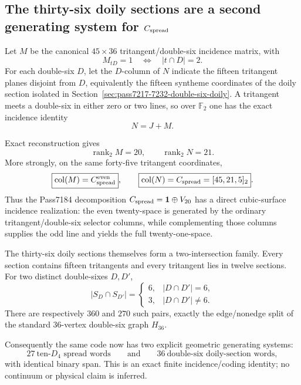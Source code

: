 \subsection{The thirty-six doily sections are a second generating system for $C_{\rm spread}$}
\label{sec:pass7241-7248-double-six-slice-generator}

Let $M$ be the canonical $45\times36$ tritangent/double-six incidence matrix, with
\[
 M_{tD}=1
 \quad\Longleftrightarrow\quad
 |t\cap D|=2.
\]
For each double-six $D$, let the $D$-column of $N$ indicate the fifteen tritangent planes disjoint from $D$, equivalently the fifteen syntheme coordinates of the doily section isolated in Section~\ref{sec:pass7217-7232-double-six-doily}.  A tritangent meets a double-six in either zero or two lines, so over $\mathbb F_2$ one has the exact incidence identity
\[
 \boxed{N=J+M}.
\]

Exact reconstruction gives
\[
 \operatorname{rank}_{2}M=20,
 \qquad
 \operatorname{rank}_{2}N=21.
\]
More strongly, on the same forty-five tritangent coordinates,
\[
 \boxed{\operatorname{col}(M)=C_{\rm spread}^{\rm even}},
 \qquad
 \boxed{\operatorname{col}(N)=C_{\rm spread}=[45,21,5]_2}.
\]
Thus the Pass7184 decomposition $C_{\rm spread}=\mathbf1\oplus V_{20}$ has a direct cubic-surface incidence realization: the even twenty-space is generated by the ordinary tritangent/double-six selector columns, while complementing those columns supplies the odd line and yields the full twenty-one-space.

The thirty-six doily sections themselves form a two-intersection family.  Every section contains fifteen tritangents and every tritangent lies in twelve sections.  For two distinct double-sixes $D,D'$,
\[
 |S_D\cap S_{D'}|=
 \begin{cases}
 6,& |D\cap D'|=6,\\
 3,& |D\cap D'|\ne6.
 \end{cases}
\]
There are respectively $360$ and $270$ such pairs, exactly the edge/nonedge split of the standard $36$-vertex double-six graph $H_{36}$.

Consequently the same code now has two explicit geometric generating systems:
\[
 \boxed{27\ \text{ten-}D_4\text{ spread words}}
 \qquad\text{and}\qquad
 \boxed{36\ \text{double-six doily-section words}},
\]
with identical binary span.  This is an exact finite incidence/coding identity; no continuum or physical claim is inferred.
